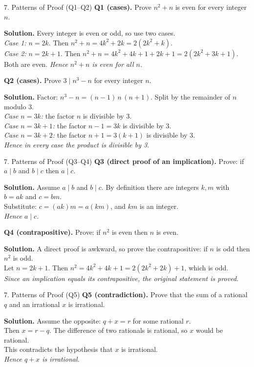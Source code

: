 \documentclass[aspectratio=169,10pt]{beamer}
\newcommand{\qa}[3]{%
  \textbf{Q#1.} #2\par\smallskip
  {\color{ans}\textbf{Solution.} #3}\par\vspace{6pt}}
\begin{document}
\begin{frame}{7. Patterns of Proof (Q1--Q2)}
\footnotesize
\qa{1 (cases)}{Prove $n^2+n$ is even for every integer $n$.}
{Every integer is even or odd, so use two cases.\\
\emph{Case 1:} $n=2k$. Then $n^2+n=4k^2+2k=2(2k^2+k)$.\\
\emph{Case 2:} $n=2k+1$. Then $n^2+n=4k^2+4k+1+2k+1=2(2k^2+3k+1)$.\\
Both are even. \emph{Hence $n^2+n$ is even for all $n$.}}
\qa{2 (cases)}{Prove $3\mid n^3-n$ for every integer $n$.}
{Factor: $n^3-n=(n-1)\,n\,(n+1)$. Split by the remainder of $n$ modulo 3.\\
\emph{Case $n=3k$:} the factor $n$ is divisible by 3.\\
\emph{Case $n=3k+1$:} the factor $n-1=3k$ is divisible by 3.\\
\emph{Case $n=3k+2$:} the factor $n+1=3(k+1)$ is divisible by 3.\\
\emph{Hence in every case the product is divisible by 3.}}
\end{frame}

\begin{frame}{7. Patterns of Proof (Q3--Q4)}
\footnotesize
\qa{3 (direct proof of an implication)}{Prove: if $a\mid b$ and $b\mid c$ then $a\mid c$.}
{Assume $a\mid b$ and $b\mid c$. By definition there are integers $k,m$ with $b=ak$ and $c=bm$.\\
Substitute: $c=(ak)m=a(km)$, and $km$ is an integer.\\
\emph{Hence $a\mid c$.}}
\qa{4 (contrapositive)}{Prove: if $n^2$ is even then $n$ is even.}
{A direct proof is awkward, so prove the contrapositive: if $n$ is odd then $n^2$ is odd.\\
Let $n=2k+1$. Then $n^2=4k^2+4k+1=2(2k^2+2k)+1$, which is odd.\\
\emph{Since an implication equals its contrapositive, the original statement is proved.}}
\end{frame}

\begin{frame}{7. Patterns of Proof (Q5)}
\footnotesize
\qa{5 (contradiction)}{Prove that the sum of a rational $q$ and an irrational $x$ is irrational.}
{Assume the opposite: $q+x=r$ for some rational $r$.\\
Then $x=r-q$. The difference of two rationals is rational, so $x$ would be rational.\\
This contradicts the hypothesis that $x$ is irrational.\\
\emph{Hence $q+x$ is irrational.}}
\end{frame}
\end{document}
